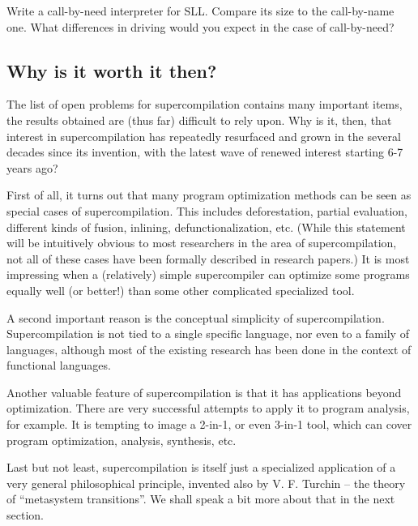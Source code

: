 \begin{exercise}
Write a call-by-need interpreter for SLL. 
Compare its size to the call-by-name one.
What differences in driving would you expect in the case of call-by-need?
\end{exercise}

\subsection{Why is it worth it then?}

The list of open problems for supercompilation contains many important items, 
the results obtained are (thus far) difficult to rely upon. 
Why is it, then, that interest in supercompilation has repeatedly 
resurfaced and grown in the several decades since its invention,
with the latest wave of renewed interest starting 6-7 years ago? 

First of all, it turns out that many program optimization methods can be
seen as special cases of supercompilation.
This includes deforestation, partial evaluation, different kinds of fusion,
inlining, defunctionalization, etc. 
(While this statement will be intuitively obvious to most researchers in the 
area of supercompilation, not all of these cases have been formally
described in research papers.)
It is most impressing when a (relatively) simple supercompiler
can optimize some programs equally well (or better!) than some 
other complicated specialized tool.

A second important reason is the conceptual simplicity of supercompilation.
Supercompilation is not tied to a single specific language, nor even to a family
of languages, although most of the existing research has been done
in the context of functional languages.

Another valuable feature of supercompilation is that it has applications
beyond optimization. 
There are very successful attempts to apply it to program analysis, for example. 
It is tempting to image a 2-in-1, or even 3-in-1 tool,
which can cover program optimization, analysis, synthesis, etc.

Last but not least, supercompilation is itself just a specialized application
of a very general philosophical principle, invented also by V. F. Turchin --
the theory of ``metasystem transitions''. We shall speak a bit more
about that in the next section.
